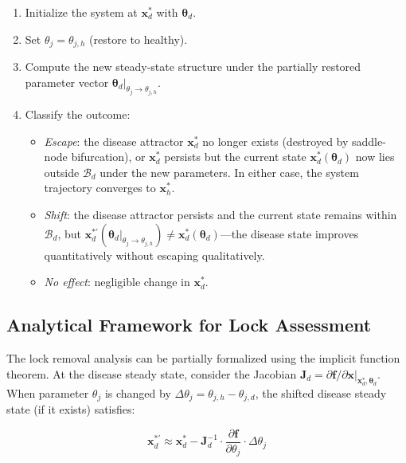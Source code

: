 \begin{enumerate}
    \item Initialize the system at $\mathbf{x}_d^*$ with $\boldsymbol{\theta}_d$.
    \item Set $\theta_j = \theta_{j,h}$ (restore to healthy).
    \item Compute the new steady-state structure under the partially restored parameter vector $\boldsymbol{\theta}_d|_{\theta_j \to \theta_{j,h}}$.
    \item Classify the outcome:
    \begin{itemize}
        \item \emph{Escape}: the disease attractor $\mathbf{x}_d^*$ no longer exists (destroyed by saddle-node bifurcation), or $\mathbf{x}_d^*$ persists but the current state $\mathbf{x}_d^*(\boldsymbol{\theta}_d)$ now lies outside $\mathcal{B}_d$ under the new parameters. In either case, the system trajectory converges to $\mathbf{x}_h^*$.
        \item \emph{Shift}: the disease attractor persists and the current state remains within $\mathcal{B}_d$, but $\mathbf{x}_d^{*\prime}(\boldsymbol{\theta}_d|_{\theta_j \to \theta_{j,h}}) \neq \mathbf{x}_d^*(\boldsymbol{\theta}_d)$---the disease state improves quantitatively without escaping qualitatively.
        \item \emph{No effect}: negligible change in $\mathbf{x}_d^*$.
    \end{itemize}
\end{enumerate}

\subsection{Analytical Framework for Lock Assessment}

The lock removal analysis can be partially formalized using the implicit function theorem. At the disease steady state, consider the Jacobian $\mathbf{J}_d = \partial \mathbf{f}/\partial \mathbf{x}|_{\mathbf{x}_d^*, \boldsymbol{\theta}_d}$. When parameter $\theta_j$ is changed by $\Delta\theta_j = \theta_{j,h} - \theta_{j,d}$, the shifted disease steady state (if it exists) satisfies:

\begin{equation}
\label{eq:lock-perturbation}
\mathbf{x}_d^{*\prime} \approx \mathbf{x}_d^* - \mathbf{J}_d^{-1} \cdot \frac{\partial \mathbf{f}}{\partial \theta_j} \cdot \Delta\theta_j
\end{equation}

